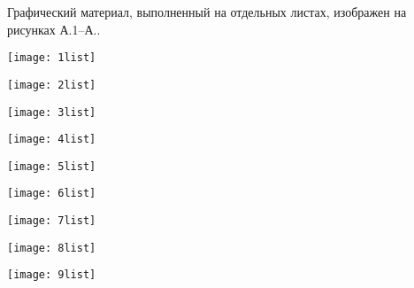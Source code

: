 
Графический материал, выполненный на отдельных листах,
изображен на рисунках А.1--А..
\setcounter{числоПлакатов}{0}

\renewcommand{\thefigure}{А.\arabic{figure}} %

\begin{landscape}

\begin{плакат}
    \texttt{[image: 1list]}
    \label{1list:image}      
\end{плакат}

\begin{плакат}
	\texttt{[image: 2list]}
	\label{2list:image}      
\end{плакат}

\begin{плакат}
	\texttt{[image: 3list]}
	\label{3list:image}      
\end{плакат}

\begin{плакат}
	\texttt{[image: 4list]}
	\label{4list:image}      
\end{плакат}

\begin{плакат}
	\texttt{[image: 5list]}
	\label{5list:image}      
\end{плакат}

\begin{плакат}
	\texttt{[image: 6list]}
	\label{6list:image}      
\end{плакат}

\begin{плакат}
	\texttt{[image: 7list]}
	\label{7list:image}      
\end{плакат}


\begin{плакат}
	\texttt{[image: 8list]}
	\label{8list:image}      
\end{плакат}


\begin{плакат}
	\texttt{[image: 9list]}
	\label{9list:image}      
\end{плакат}



\end{landscape}
